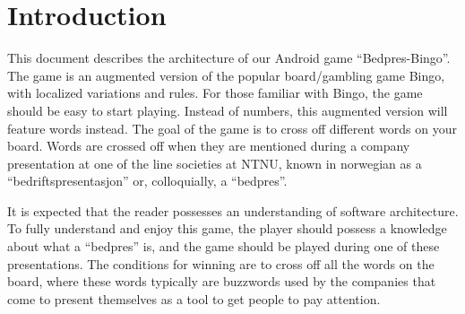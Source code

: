 \section{Introduction}
\label{sec:introduction}
This document describes the architecture of our Android game ``Bedpres-Bingo''.
The game is an augmented version of the popular board/gambling game Bingo,
with localized variations and rules. For those familiar with Bingo,
the game should be easy to start playing. Instead of numbers, this augmented
version will feature words instead. The goal of the game is to cross off
different words on your board. Words are crossed off when they are mentioned
during a company presentation at one of the line societies at NTNU, known in
norwegian as a ``bedriftspresentasjon'' or, colloquially, a ``bedpres''.

It is expected that the reader possesses an understanding of software
architecture. To fully understand and enjoy this game, the player should
possess a knowledge about what a ``bedpres'' is, and the game should be played
during one of these presentations. The conditions for winning are to cross off
all the words on the board, where these words typically are buzzwords used by
the companies that come to present themselves as a tool to get people to pay
attention.
